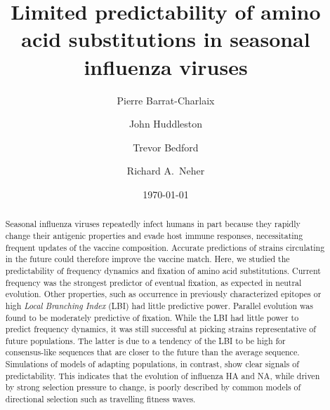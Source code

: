 \documentclass[reprint,amsmath,amssymb,superscriptaddress,showpacs,rmp]{revtex4-1}
\begin{document}
\title{Limited predictability of amino acid substitutions in seasonal influenza viruses}
\date{} 					

\author{Pierre Barrat-Charlaix} 
%
\author{John Huddleston}
%
\author{Trevor Bedford}
%
\author{Richard A.~Neher}

\begin{abstract}
	Seasonal influenza viruses repeatedly infect humans in part because they rapidly change their antigenic properties and evade host immune responses, necessitating frequent updates of the vaccine composition. 
	Accurate predictions of strains circulating in the future could therefore improve the vaccine match. 
	Here, we studied the predictability of frequency dynamics and fixation of amino acid substitutions.
	Current frequency was the strongest predictor of eventual fixation, as expected in neutral evolution. 
    Other properties, such as occurrence in previously characterized epitopes or high \emph{Local Branching Index} (LBI) had little predictive power. 
	Parallel evolution was found to be moderately predictive of fixation. 
	While the LBI had little power to predict frequency dynamics, it was still successful at picking strains representative of future populations. 
	The latter is due to a tendency of the LBI to be high for consensus-like sequences that are closer to the future than the average sequence. 
	Simulations of models of adapting populations, in contrast, show clear signals of predictability. 
	This indicates that the evolution of influenza HA and NA, while driven by strong selection pressure to change, is poorly described by common models of directional selection such as travelling fitness waves.  
\end{abstract}
\date{\today}
\maketitle
\end{document}

